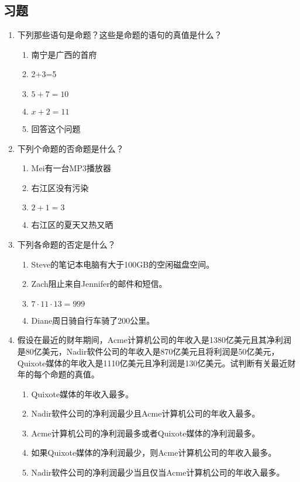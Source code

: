\subsection{习题}
\begin{enumerate}
	\item	
		下列那些语句是命题？这些是命题的语句的真值是什么？
		\begin{enumerate}
			\item	南宁是广西的首府
			\item	2+3=5
			\item	$5+7=10$
			\item	$x+2=11$
			\item	回答这个问题
		\end{enumerate}
	\item
		下列个命题的否命题是什么？
		\begin{enumerate}
			\item	Mei有一台MP3播放器
			\item	右江区没有污染
			\item	$2+1=3$
			\item	右江区的夏天又热又晒
		\end{enumerate}
	\item
		下列各命题的否定是什么？
		\begin{enumerate}
			\item	Steve的笔记本电脑有大于100GB的空闲磁盘空间。
			\item	Zach阻止来自Jennifer的邮件和短信。
			\item	$7 \cdot 11 \cdot 13 = 999 $
			\item	Diane周日骑自行车骑了200公里。
		\end{enumerate}
	\item
		假设在最近的财年期间，Acme计算机公司的年收入是1380亿美元且其净利润是80亿美元，Nadir软件公司的年收入是870亿美元且将利润是50亿美元，Quixote媒体的年收入是1110亿美元且净利润是130亿美元。试判断有关最近财年的每个命题的真值。
		\begin{enumerate}
			\item	Quixote媒体的年收入最多。
			\item	Nadir软件公司的净利润最少且Acme计算机公司的年收入最多。
			\item	Acme计算机公司的净利润最多或者Quixote媒体的净利润最多。
			\item	如果Quixote媒体的净利润最少，则Acme计算机公司的年收入最多。
			\item	Nadir软件公司的净利润最少当且仅当Acme计算机公司的年收入最多。
		\end{enumerate}

\end{enumerate}
